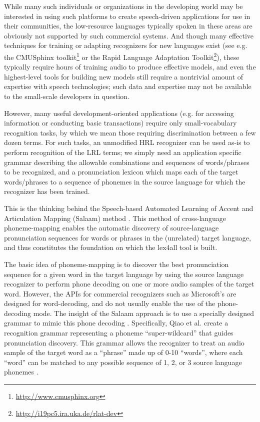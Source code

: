 \documentclass[11pt]{article}
\begin{document}
While many such individuals or organizations in the developing world may be interested in using such platforms to create speech-driven applications for use in their communities, the low-resource languages typically spoken in these areas are obviously not supported by such commercial systems. 
And though many effective techniques for training or adapting recognizers for new languages exist (see e.g. the CMUSphinx toolkit\footnote{\url{http://www.cmusphinx.org}} or the Rapid Language Adaptation Toolkit\footnote{\url{http://i19pc5.ira.uka.de/rlat-dev}}), these typically require hours of training audio to produce effective models, and even the highest-level tools for building new models still require a nontrivial amount of expertise with speech technologies; such data and expertise may not be available to the small-scale developers in question.

However, many useful development-oriented applications (e.g. for accessing information or conducting basic transactions) require only small-vocabulary recognition tasks, by which we mean those requiring discrimination between a few dozen terms.
For such tasks, an unmodified HRL recognizer can be used as-is to perform recognition of the LRL terms; we simply need an application specific grammar describing the allowable combinations and sequences of words/phrases to be recognized, and a pronunciation lexicon which maps each of the target words/phrases to a sequence of phonemes in the source language for which the recognizer has been trained.

This is the thinking behind the Speech-based Automated Learning of Accent and Articulation Mapping (Salaam) method \cite{Sherwani09,Qiao10,Chan12}. This method of cross-language phoneme-mapping enables the automatic discovery of source-language pronunciation sequences for words or phrases in the (unrelated) target language, and thus constitutes the foundation on which the lex4all tool is built.

The basic idea of phoneme-mapping is to discover the best pronunciation sequence for a given word in the target language by using the source language recognizer to perform phone decoding on one or more audio samples of the target word. However, the APIs for commercial recognizers such as Microsoft's are designed for word-decoding, and do not usually enable the use of the phone-decoding mode. The insight of the Salaam approach is to use a specially designed grammar to mimic this phone decoding \cite[\S3.2]{Chan12}. 
Specifically, Qiao et al. \cite[§4.1]{Qiao10} create a recognition grammar representing a phoneme ``super-wildcard'' that guides pronunciation discovery. 
This grammar allows the recognizer to treat an audio sample of the target word as a ``phrase'' made up of 0-10 ``words'',
where each ``word'' can be matched to any possible sequence of 1, 2, or 3 source language phonemes \cite[§4.1]{Qiao10}. 
\end{document}
